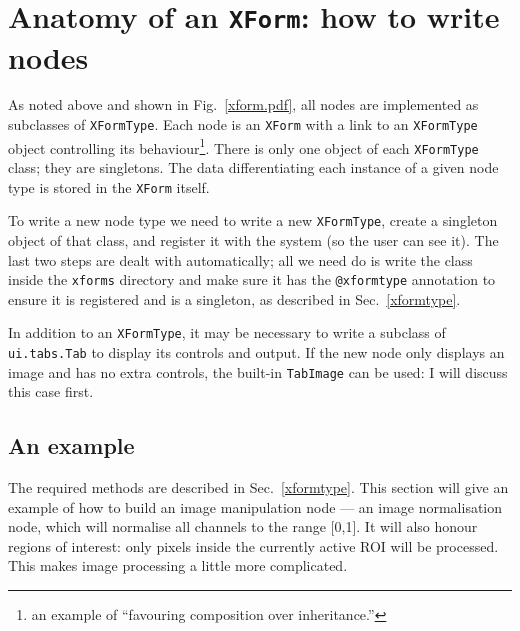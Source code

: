 

\section{Anatomy of an \texttt{XForm}: how to write nodes}
\label{writingnodes}
As noted above and shown in Fig.~\ref{xform.pdf}, all nodes are 
implemented as subclasses of \texttt{XFormType}. Each node 
is an \texttt{XForm} with a link to an \texttt{XFormType} object
controlling its behaviour\footnote{an example of ``favouring
composition over inheritance.''}.
There is only one object of each \texttt{XFormType} class; they
are singletons. The data differentiating each instance of 
a given node type is stored in the \texttt{XForm} itself.

To write a new node type we need to write a new \texttt{XFormType},
create a singleton object of that class, and register it with the system
(so the user can see it). The last two steps are dealt with automatically;
all we need do is write the class inside the \texttt{xforms} directory
and make sure it has the \texttt{@xformtype} annotation to ensure
it is registered and is a singleton, as described in 
Sec.~\ref{xformtype}.

In addition to an \texttt{XFormType}, it may be necessary to write
a subclass of \texttt{ui.tabs.Tab} to display its controls and output.
If the new node only displays
an image and has no extra controls, the built-in \texttt{TabImage}
can be used: I will discuss this case first.

\subsection{An example}
The required methods are described in Sec.~\ref{xformtype}. This
section will give an example of how to build an image manipulation
node --- an image normalisation node, which will normalise all channels
to the range [0,1]. It will also honour regions of interest:
only pixels inside the currently active ROI will be processed. This makes
image processing a little more complicated.

